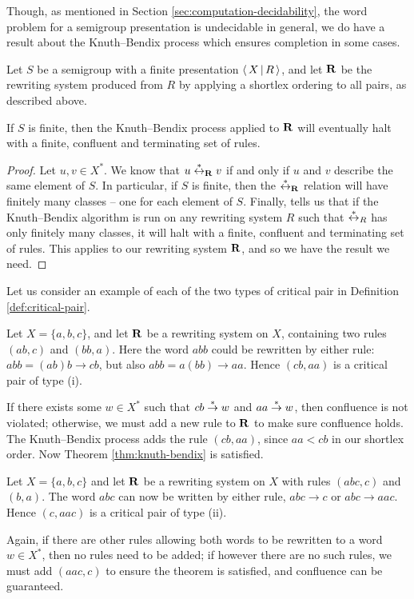 Though, as mentioned in Section \ref{sec:computation-decidability}, the word problem for a
semigroup presentation is undecidable in general, we do have a result about the
Knuth--Bendix process which ensures completion in some cases.

\begin{theorem}
  \label{thm:kb-halt}
  Let $S$ be a semigroup with a finite presentation $\left\langle \, X \, \middle| \, R \, \right\rangle$, and let $\mathbf{R}$
  be the rewriting system produced from $R$ by applying a shortlex ordering to
  all pairs, as described above.

  If $S$ is finite, then the Knuth--Bendix process applied to $\mathbf{R}$ will
  eventually halt with a finite, confluent and terminating set of rules.

  \begin{proof}
    Let $u,v \in X^*$.  We know that $u \stackrel{*}{\leftrightarrow}_{\mathbf{R}} v$ if and only if $u$ and
    $v$ describe the same element of $S$.  In particular, if $S$ is finite, then
    the $\stackrel{*}{\leftrightarrow}_{\mathbf{R}}$ relation will have finitely many classes -- one for each
    element of $S$.  Finally, \cite[Corollary 12.21]{cgt} tells us that if the
    Knuth--Bendix algorithm is run on any rewriting system $R$ such that
    $\stackrel{*}{\leftrightarrow}_R$ has only finitely many classes, it will halt with a finite,
    confluent and terminating set of rules.  This applies to our rewriting
    system $\mathbf{R}$, and so we have the result we need.
  \end{proof}
\end{theorem}

Let us consider an example of each of the two types of critical pair in
Definition \ref{def:critical-pair}.

\begin{example}
  Let $X=\{a,b,c\}$, and let $\mathbf{R}$ be a rewriting system on $X$, containing
  two rules $(ab, c)$ and $(bb, a)$.  Here the word $abb$ could be
  rewritten by either rule: $abb = (ab)b \to cb$, but also
  $abb = a(bb) \to aa$.  Hence $(cb, aa)$ is a critical pair of type (i).

  If there exists some $w \in X^*$ such that $cb \stackrel{*}{\to} w$ and $aa \stackrel{*}{\to} w$,
  then confluence is not violated; otherwise, we must add a new rule to $\mathbf{R}$
  to make sure confluence holds.  The Knuth--Bendix process adds the rule
  $(cb, aa)$, since $aa < cb$ in our shortlex order.  Now Theorem
  \ref{thm:knuth-bendix} is satisfied.
\end{example}

\begin{example}
  Let $X=\{a,b,c\}$ and let $\mathbf{R}$ be a rewriting system on $X$ with rules
  $(abc, c)$ and $(b, a)$.  The word $abc$ can now be written by either rule,
  $abc \to c$ or $abc \to aac$.  Hence $(c, aac)$ is a critical pair of type
  (ii).

  Again, if there are other rules allowing both words to be rewritten to a word
  $w \in X^*$, then no rules need to be added; if however there are no such
  rules, we must add $(aac, c)$ to ensure the theorem is satisfied, and
  confluence can be guaranteed.
\end{example}

